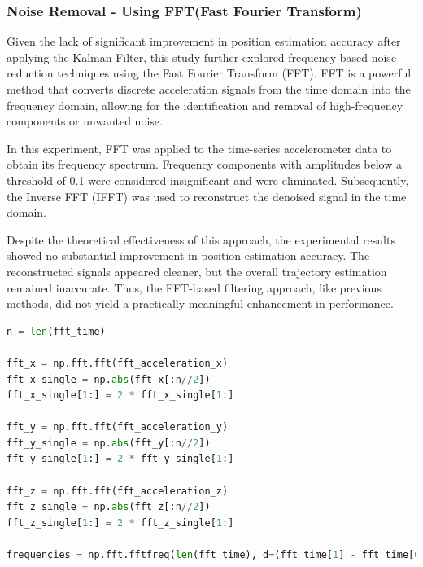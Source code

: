\documentclass{article}
\begin{document}
    \FloatBarrier
    \subsubsection{Noise Removal - Using FFT(Fast Fourier Transform)}
    Given the lack of significant improvement in position estimation accuracy after
    applying the Kalman Filter, this study further explored frequency-based
    noise reduction techniques using the Fast Fourier Transform (FFT). FFT is a powerful
    method that converts discrete acceleration signals from the time domain into
    the frequency domain, allowing for the identification and removal of high-frequency
    components or unwanted noise.

    In this experiment, FFT was applied to the time-series accelerometer data to
    obtain its frequency spectrum. Frequency components with amplitudes below a
    threshold of 0.1 were considered insignificant and were eliminated. Subsequently,
    the Inverse FFT (IFFT) was used to reconstruct the denoised signal in the
    time domain.

    Despite the theoretical effectiveness of this approach, the experimental results
    showed no substantial improvement in position estimation accuracy. The
    reconstructed signals appeared cleaner, but the overall trajectory estimation
    remained inaccurate. Thus, the FFT-based filtering approach, like previous
    methods, did not yield a practically meaningful enhancement in performance.
    \begin{lstlisting}[language=Python, caption={Fast Fourier Transform for noise reduction}, label={lst:fft_noise_reduction}]
n = len(fft_time)

fft_x = np.fft.fft(fft_acceleration_x)
fft_x_single = np.abs(fft_x[:n//2])
fft_x_single[1:] = 2 * fft_x_single[1:]

fft_y = np.fft.fft(fft_acceleration_y)
fft_y_single = np.abs(fft_y[:n//2])
fft_y_single[1:] = 2 * fft_y_single[1:]

fft_z = np.fft.fft(fft_acceleration_z)
fft_z_single = np.abs(fft_z[:n//2])
fft_z_single[1:] = 2 * fft_z_single[1:]

frequencies = np.fft.fftfreq(len(fft_time), d=(fft_time[1] - fft_time[0]))
\end{lstlisting}
\end{document}
